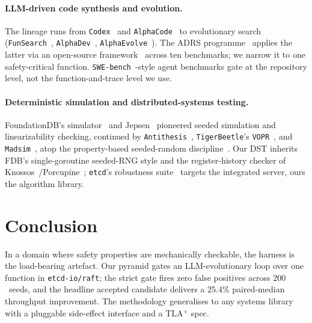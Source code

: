 \documentclass{article}
\begin{document}
\paragraph{LLM-driven code synthesis and evolution.}
The lineage runs from \texttt{Codex}~\cite{codex} and
\texttt{AlphaCode}~\cite{alphacode} to evolutionary search
(\texttt{FunSearch}~\cite{funsearch},
\texttt{AlphaDev}~\cite{alphadev},
\texttt{AlphaEvolve}~\cite{alphaevolve}).  The ADRS
programme~\cite{barbarians2025} applies the latter via an open-source
framework~\cite{openevolve} across ten benchmarks; we narrow it to one
safety-critical function. \texttt{SWE-bench}~\cite{swebench}-style agent
benchmarks gate at the repository level, not the function-and-trace
level we use.

\paragraph{Deterministic simulation and distributed-systems testing.}
FoundationDB's simulator~\cite{fdbsim,foundationdb} and
Jepsen~\cite{jepsen} pioneered seeded simulation and linearizability
checking, continued by \texttt{Antithesis}~\cite{antithesis},
\texttt{TigerBeetle}'s \texttt{VOPR}~\cite{tigerbeetleDST}, and
\texttt{Madsim}~\cite{madsim}, atop the property-based seeded-random
discipline~\cite{quickcheck,hypothesis}. Our DST inherits FDB's
single-goroutine seeded-RNG style and the register-history checker of
Knossos~\cite{knossos}/Porcupine~\cite{porcupine}; \texttt{etcd}'s
robustness suite~\cite{etcdRobustness} targets the integrated server,
ours the algorithm library.

\section{Conclusion}
\label{sec:conclusion}

In a domain where safety properties are mechanically checkable, the
harness is the load-bearing artefact. Our pyramid gates an
LLM-evolutionary loop over one function in \texttt{etcd-io/raft};
the strict gate fires zero false positives across $200$~seeds, and
the headline accepted candidate delivers a $25.4\%$ paired-median
throughput improvement. The methodology generalises to any systems
library with a pluggable side-effect interface and a TLA$^{+}$
spec.

\begin{ack}
\end{ack}
\end{document}
